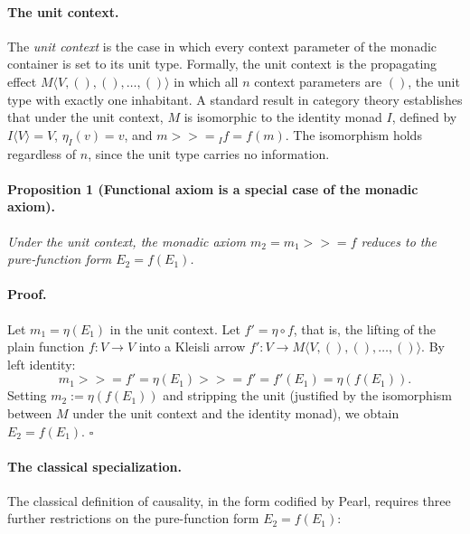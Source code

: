 \paragraph{The unit context.}
The \emph{unit context} is the case in which every context parameter of the monadic container is set to its unit type. Formally, the unit context is the propagating effect $M\langle V, (), (), \ldots, () \rangle$ in which all $n$ context parameters are $()$, the unit type with exactly one inhabitant. A standard result in category theory establishes that under the unit context, $M$ is isomorphic to the identity monad $I$, defined by $I\langle V \rangle = V$, $\eta_I(v) = v$, and $m \mathbin{>\!\!>\!\!=}_I f = f(m)$. The isomorphism holds regardless of $n$, since the unit type carries no information.


\paragraph{Proposition 1 (Functional axiom is a special case of the monadic axiom).}
\emph{Under the unit context, the monadic axiom $m_2 = m_1 \mathbin{>\!\!>\!\!=} f$ reduces to the pure-function form $E_2 = f(E_1)$.}
 
\paragraph{Proof.}
Let $m_1 = \eta(E_1)$ in the unit context. Let $f' = \eta \circ f$, that is, the lifting of the plain function $f : V \to V$ into a Kleisli arrow $f' : V \to M\langle V, (), (), \ldots, () \rangle$. By left identity:
\[
m_1 \mathbin{>\!\!>\!\!=} f' = \eta(E_1) \mathbin{>\!\!>\!\!=} f' = f'(E_1) = \eta(f(E_1)).
\]
Setting $m_2 := \eta(f(E_1))$ and stripping the unit (justified by the isomorphism between $M$ under the unit context and the identity monad), we obtain $E_2 = f(E_1)$. $\square$
 
\paragraph{The classical specialization.}
The classical definition of causality, in the form codified by Pearl\cite{pearl2000causality}, requires three further restrictions on the pure-function form $E_2 = f(E_1)$:
 
